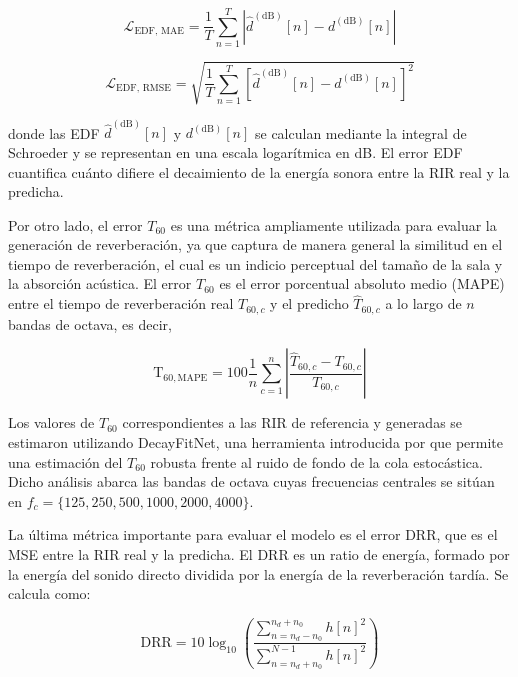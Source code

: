 \begin{equation}
\mathcal{L}_{\mathrm{EDF,\,MAE}} = \frac{1}{T} \sum_{n=1}^{T} \left| \hat{d}^{(\mathrm{dB})}[n] - d^{(\mathrm{dB})}[n] \right|
\end{equation}

\begin{equation}
\mathcal{L}_{\mathrm{EDF,\,RMSE}} = \sqrt{\frac{1}{T} \sum_{n=1}^{T} \left[ \hat{d}^{(\mathrm{dB})}[n] - d^{(\mathrm{dB})}[n] \right]^2}
\end{equation}

donde las EDF $\hat{d}^{(\mathrm{dB})}[n]$ y $d^{(\mathrm{dB})}[n]$ se calculan mediante la integral de Schroeder \cite{Schroeder1965} y se representan en una escala logarítmica en dB. El error EDF cuantifica cuánto difiere el decaimiento de la energía sonora entre la RIR real y la predicha.

Por otro lado, el error $T_{60}$ es una métrica ampliamente utilizada para evaluar la generación de reverberación, ya que captura de manera general la similitud en el tiempo de reverberación, el cual es un indicio perceptual del tamaño de la sala y la absorción acústica. El error $T_{60}$ es el error porcentual absoluto medio (MAPE) entre el tiempo de reverberación real $T_{60,c}$ y el predicho $\widehat{T}_{60,c}$ a lo largo de $n$ bandas de octava, es decir,

\begin{equation}
\mathrm{T}_{60,\mathrm{MAPE}} = 100 \frac{1}{n} \sum_{c=1}^{n} \left| \frac{\widehat{T}_{60,c} - T_{60,c}}{T_{60,c}} \right|
\end{equation}

Los valores de $T_{60}$ correspondientes a las RIR de referencia y generadas se estimaron utilizando DecayFitNet, una herramienta introducida por \cite{EDF22} que permite una estimación del $T_{60}$ robusta frente al ruido de fondo de la cola estocástica. Dicho análisis abarca las bandas de octava cuyas frecuencias centrales se sitúan en $f_c = \{125, 250, 500, 1000, 2000, 4000\}$.

La última métrica importante para evaluar el modelo es el error DRR, que es el MSE entre la RIR real y la predicha. El DRR es un ratio de energía, formado por la energía del sonido directo dividida por la energía de la reverberación tardía. Se calcula como: 

\begin{equation}
\mathrm{DRR} = 10 \log_{10} \left( \frac{\sum_{n=n_d-n_0}^{n_d+n_0} h[n]^2}{\sum_{n=n_d+n_0}^{N-1} h[n]^2} \right)
\end{equation}     

